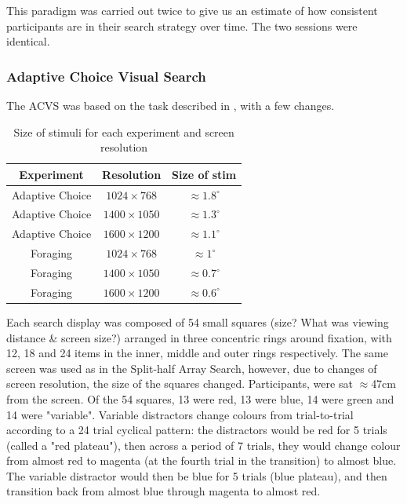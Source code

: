 \documentclass[]{rsos}%
\begin{document}
This paradigm was carried out twice to give us an estimate of how consistent participants are in their search strategy over time. The two sessions were identical.

\subsubsection{Adaptive Choice Visual Search}

The ACVS was based on the task described in \cite{irons-leber2016}, with a few changes.

\begin{table}
	\centering
	\small
	\begin{tabular}{cc|c}
	    Experiment	    &	Resolution	     & Size of stim \\
		\hline
		Adaptive Choice & $1024 \times 768$  & $\approx$$1.8^{\circ}$ \\
		Adaptive Choice & $1400 \times 1050$ & $\approx$$1.3^{\circ}$ \\
		Adaptive Choice & $1600 \times 1200$ & $\approx$$1.1^{\circ}$ \\
		Foraging        & $1024 \times 768$  & $\approx$$1^{\circ}$ \\
		Foraging        & $1400 \times 1050$ & $\approx$$0.7^{\circ}$ \\
		Foraging        & $1600 \times 1200$ & $\approx$$0.6^{\circ}$ \\
	\end{tabular}
	\caption{Size of stimuli for each experiment and screen resolution}
	\label{tab:Screen_Res}
\end{table}

Each search display was composed of 54 small squares (size? What was viewing distance \& screen size?) arranged in three concentric rings around fixation, with 12, 18 and 24 items in the inner, middle and outer rings respectively. The same screen was used as in the Split-half Array Search, however, due to changes of screen resolution, the size of the squares changed. Participants, were sat $\approx$47cm from the screen. Of the 54 squares, 13 were red, 13 were blue, 14 were green and 14 were "variable". Variable distractors change colours from trial-to-trial according to a 24 trial cyclical pattern: the distractors would be red for 5 trials (called a "red plateau"), then across a period of 7 trials, they would change colour from almost red to magenta (at the fourth trial in the transition) to almost blue. The variable distractor would then be blue for 5 trials (blue plateau), and then transition back from almost blue through magenta to almost red. 
\end{document}
